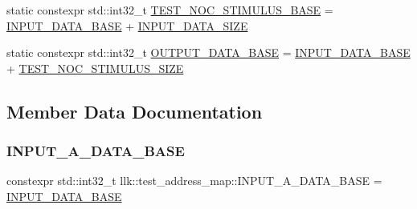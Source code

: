 \begin{DoxyCompactItemize}
\item 
static constexpr std\+::int32\+\_\+t \hyperlink{structllk_1_1test__address__map_af3b7da969b76bd5e9d9325e779acd305}{T\+E\+S\+T\+\_\+\+N\+O\+C\+\_\+\+S\+T\+I\+M\+U\+L\+U\+S\+\_\+\+B\+A\+SE} = \hyperlink{structllk_1_1test__address__map_a9763e06ea1548f6ba96d81917d160aca}{I\+N\+P\+U\+T\+\_\+\+D\+A\+T\+A\+\_\+\+B\+A\+SE} + \hyperlink{structllk_1_1test__address__map_af93ac7086d8cd7aa23029e19d3ef046d}{I\+N\+P\+U\+T\+\_\+\+D\+A\+T\+A\+\_\+\+S\+I\+ZE}
\item 
static constexpr std\+::int32\+\_\+t \hyperlink{structllk_1_1test__address__map_afcf29d8dc68481560890a764c4d24d16}{O\+U\+T\+P\+U\+T\+\_\+\+D\+A\+T\+A\+\_\+\+B\+A\+SE} = \hyperlink{structllk_1_1test__address__map_a9763e06ea1548f6ba96d81917d160aca}{I\+N\+P\+U\+T\+\_\+\+D\+A\+T\+A\+\_\+\+B\+A\+SE} + \hyperlink{structllk_1_1test__address__map_a2e772fcd41be9095c510e88ddee25e2b}{T\+E\+S\+T\+\_\+\+N\+O\+C\+\_\+\+S\+T\+I\+M\+U\+L\+U\+S\+\_\+\+S\+I\+ZE}
\end{DoxyCompactItemize}


\subsection{Member Data Documentation}
\mbox{\label{structllk_1_1test__address__map_aa7e777bfe390089b1ecc644e5235e7d4}} 
\subsubsection{\texorpdfstring{I\+N\+P\+U\+T\+\_\+\+A\+\_\+\+D\+A\+T\+A\+\_\+\+B\+A\+SE}{INPUT\_A\_DATA\_BASE}}
{\footnotesize\ttfamily constexpr std\+::int32\+\_\+t llk\+::test\+\_\+address\+\_\+map\+::\+I\+N\+P\+U\+T\+\_\+\+A\+\_\+\+D\+A\+T\+A\+\_\+\+B\+A\+SE = \hyperlink{structllk_1_1test__address__map_a9763e06ea1548f6ba96d81917d160aca}{I\+N\+P\+U\+T\+\_\+\+D\+A\+T\+A\+\_\+\+B\+A\+SE}\hspace{0.3cm}{\ttfamily [static]}}

\mbox{\label{structllk_1_1test__address__map_a161f7bddf7faeec9b275f611caaac750}} 
